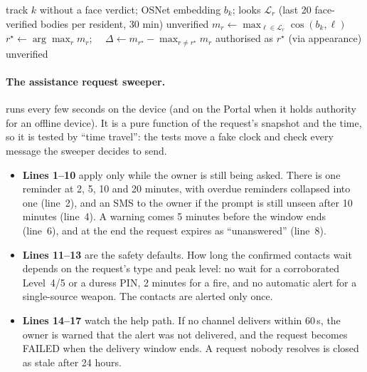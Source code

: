 \begin{algorithm}[htbp]
\caption{Resident identity from body appearance (home mode only)}
\label{alg:reid}
\small
\begin{algorithmic}[1]
\Require track $k$ without a face verdict; OSNet embedding $b_k$; looks $\mathcal{L}_r$ (last 20 face-verified bodies per resident, 30 min)
 \Return unverified \EndIf
{}
  \State $m_r \gets \max_{\ell \in \mathcal{L}_r} \cos(b_k, \ell)$
\EndFor
\State $r^\star \gets \arg\max_r m_r$; \ \ $\Delta \gets m_{r^\star} - \max_{r \neq r^\star} m_r$
 \Return authorised as $r^\star$ (via appearance) \EndIf
\State \Return unverified
\end{algorithmic}
\end{algorithm}

\paragraph{The assistance request sweeper.}  runs every few seconds on the device (and on the Portal when it holds authority for an offline device). It is a pure function of the request's snapshot and the time, so it is tested by ``time travel'': the tests move a fake clock and check every message the sweeper decides to send.
\begin{itemize}
\item \textbf{Lines 1--10} apply only while the owner is still being asked. There is one reminder at 2, 5, 10 and 20 minutes, with overdue reminders collapsed into one (line~2), and an SMS to the owner if the prompt is still unseen after 10 minutes (line~4). A warning comes 5 minutes before the window ends (line~6), and at the end the request expires as ``unanswered'' (line~8).
\item \textbf{Lines 11--13} are the safety defaults. How long the confirmed contacts wait depends on the request's type and peak level: no wait for a corroborated Level~4/5 or a duress PIN, 2 minutes for a fire, and no automatic alert for a single-source weapon. The contacts are alerted only once.
\item \textbf{Lines 14--17} watch the help path. If no channel delivers within 60\,s, the owner is warned that the alert was not delivered, and the request becomes FAILED when the delivery window ends. A request nobody resolves is closed as stale after 24 hours.
\end{itemize}

